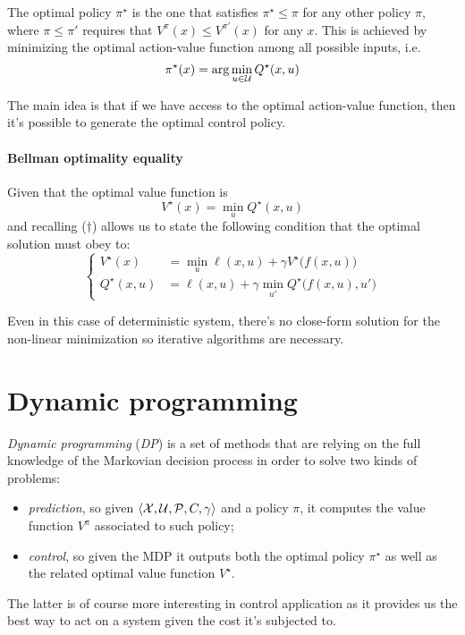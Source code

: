 	The optimal policy $\pi^\star$ is the one that satisfies $\pi^\star \leq \pi$ for any other policy $\pi$, where $\pi\leq \pi'$ requires that $V^\pi(x) \leq V^{\pi'}(x)$ for any $x$. This is achieved by minimizing the optimal action-value function among all possible inputs, i.e. 
	\begin{equation}
		\pi^\star (x) = \arg \min_{u\in \mathcal U} Q^\star(x,u)
	\end{equation}
	
	The main idea is that if we have access to the optimal action-value function, then it's possible to generate the optimal control policy.
	
	\paragraph{Bellman optimality equality} Given that the optimal value function is
	\[ V^\star (x) = \min_u Q^\star(x,u) \]
	and recalling ($\dagger$) allows us to state the following condition that the optimal solution must obey to:
	\begin{equation}
	\begin{cases}
		V^\star(x) & = \min_u \ell(x,u) + \gamma V^\star \big(f(x,u)\big) \\
		Q^\star(x,u) & = \ell(x,u) + \gamma \min_{u'} Q^\star\big(f(x,u), u'\big)
	\end{cases}
	\end{equation}

	Even in this case of deterministic system, there's no close-form solution for the non-linear minimization so iterative algorithms are necessary.
	
\section{Dynamic programming}
	\textit{Dynamic programming} (\textit{DP}) is a set of methods that are relying on the full knowledge of the Markovian decision process in order to solve two kinds of problems:
	\begin{itemize}
		\item \textit{prediction}, so given $\langle \mathcal X,\mathcal U,\mathcal P, C,\gamma\rangle$ and a policy $\pi$, it computes the value function $V^\pi$ associated to such policy;
		\item \textit{control}, so given the MDP it outputs both the optimal policy $\pi^\star$ as well as the related optimal value function $V^\star$.
	\end{itemize}
	The latter is of course more interesting in control application as it provides us the best way to act on a system given the cost it's subjected to.
	
